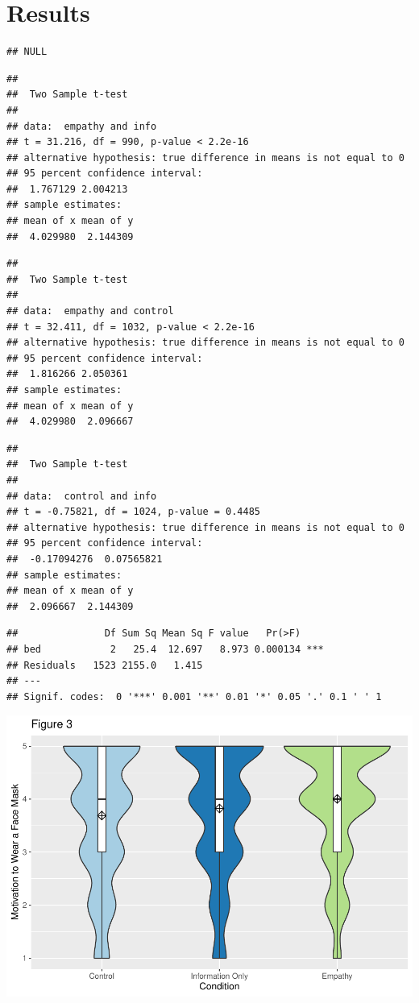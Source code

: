 \documentclass[
  english,
  man]{apa6}
\begin{document}
\newpage

\hypertarget{results}{%
\section{Results}\label{results}}

\begin{verbatim}
## NULL
\end{verbatim}

\begin{verbatim}
## 
##  Two Sample t-test
## 
## data:  empathy and info
## t = 31.216, df = 990, p-value < 2.2e-16
## alternative hypothesis: true difference in means is not equal to 0
## 95 percent confidence interval:
##  1.767129 2.004213
## sample estimates:
## mean of x mean of y 
##  4.029980  2.144309
\end{verbatim}

\begin{verbatim}
## 
##  Two Sample t-test
## 
## data:  empathy and control
## t = 32.411, df = 1032, p-value < 2.2e-16
## alternative hypothesis: true difference in means is not equal to 0
## 95 percent confidence interval:
##  1.816266 2.050361
## sample estimates:
## mean of x mean of y 
##  4.029980  2.096667
\end{verbatim}

\begin{verbatim}
## 
##  Two Sample t-test
## 
## data:  control and info
## t = -0.75821, df = 1024, p-value = 0.4485
## alternative hypothesis: true difference in means is not equal to 0
## 95 percent confidence interval:
##  -0.17094276  0.07565821
## sample estimates:
## mean of x mean of y 
##  2.096667  2.144309
\end{verbatim}

\begin{verbatim}
##               Df Sum Sq Mean Sq F value   Pr(>F)    
## bed            2   25.4  12.697   8.973 0.000134 ***
## Residuals   1523 2155.0   1.415                     
## ---
## Signif. codes:  0 '***' 0.001 '**' 0.01 '*' 0.05 '.' 0.1 ' ' 1
\end{verbatim}

\includegraphics{APA-Report_files/figure-latex/unnamed-chunk-6-1.pdf}
\end{document}
